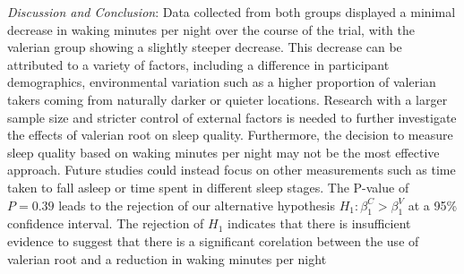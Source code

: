 \documentclass[10pt,preprintnumbers,amsmath,amssymb,floatfix,twocolumn,prl]{revtex4-2}
\begin{document}
\textit{Discussion and Conclusion}: Data collected from both groups displayed a minimal decrease in waking minutes per night over the course of the trial, with the valerian group showing a slightly steeper decrease. This decrease can be attributed to a variety of factors, including a difference in participant demographics, environmental variation such as a higher proportion of valerian takers coming from naturally darker or quieter locations. 
Research with a larger sample size and stricter control of external factors is needed to further investigate the effects of valerian root on sleep quality. Furthermore, the decision to measure sleep quality based on waking minutes per night may not be the most effective approach. Future studies could instead focus on other measurements such as time taken to fall asleep or time spent in different sleep stages.
The P-value of $P = 0.39$ leads to the rejection of our alternative hypothesis $H_1: \beta_1^C > \beta_1^V$ at a 95\% confidence interval. The rejection of $H_1$ indicates that there is insufficient evidence to suggest that there is a significant corelation between the use of valerian root and a reduction in waking minutes per night





\end{document}
